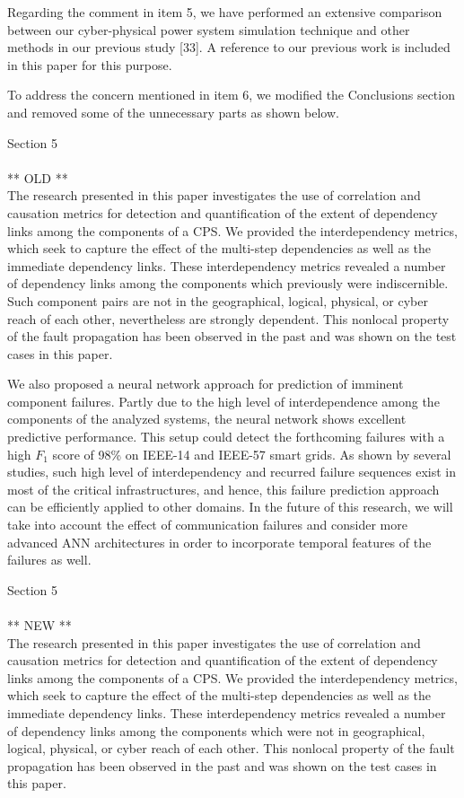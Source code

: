 \documentclass{article}
\newenvironment{response}{
  \doublespacing
  \setlength\parindent{0.05\linewidth}
  \ttfamily
}{}
\newenvironment{textblock}[1]
{\begin{tcolorbox}[breakable,enhanced]{#1 \\ \\}}
{\end{tcolorbox}}
\begin{document}
\begin{response}
Regarding the comment in item 5, we have performed an extensive comparison between our cyber-physical power system simulation technique and other methods in our previous study [33]. A reference to our previous work is included in this paper for this purpose.

To address the concern mentioned in item 6, we modified the Conclusions section and removed some of the unnecessary parts as shown below.

\begin{textblock}{Section 5}
** OLD **\\
The research presented in this paper investigates the use of correlation and causation metrics for detection and quantification of the extent of dependency links among the components of a CPS. We provided the interdependency metrics, which seek to capture the effect of the multi-step dependencies as well as the immediate dependency links. These interdependency metrics revealed a number of dependency links among the components which previously were indiscernible. Such component pairs are not in the geographical, logical, physical, or cyber reach of each other, nevertheless are strongly dependent. This nonlocal property of the fault propagation has been observed in the past and was shown on the test cases in this paper.

We also proposed a neural network approach for prediction of imminent component failures. Partly due to the high level of interdependence among the components of the analyzed systems, the neural network shows excellent predictive performance. This setup could detect the forthcoming failures with a high $F_1$ score of 98\% on IEEE-14 and IEEE-57 smart grids. As shown by several studies, such high level of interdependency and recurred failure sequences exist in most of the critical infrastructures, and hence, this failure prediction approach can be efficiently applied to other domains. In the future of this research, we will take into account the effect of communication failures and consider more advanced ANN architectures in order to incorporate temporal features of the failures as well.
\end{textblock}

\begin{textblock}{Section 5}
** NEW **\\
The research presented in this paper investigates the use of correlation and causation metrics for detection and quantification of the extent of dependency links among the components of a CPS. We provided the interdependency metrics, which seek to capture the effect of the multi-step dependencies as well as the immediate dependency links. These interdependency metrics revealed a number of dependency links among the components which were not in geographical, logical, physical, or cyber reach of each other. This nonlocal property of the fault propagation has been observed in the past and was shown on the test cases in this paper.


\end{textblock}
\end{response}
\end{document}
